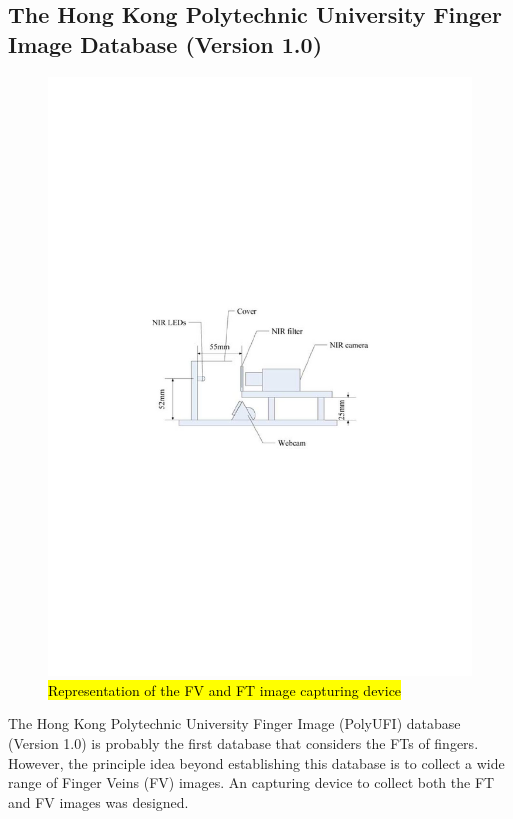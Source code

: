 \documentclass[review]{elsarticle}
\begin{document}
\subsection{The Hong Kong Polytechnic University Finger Image Database (Version 1.0)}
		\begin{figure}[!b]
			\centering
			\includegraphics[page=1,scale=1,trim=5cm 11.2cm 5cm 11cm,clip]{fv_ft_device.pdf}
			\caption{\hl{Representation of the FV and FT image capturing device} \cite{Kumar2012Human}}
			\label{fig:fv_ft_device}
		\end{figure}
	The Hong Kong Polytechnic University Finger Image (PolyUFI) database (Version 1.0) is probably the first database that considers the FTs of fingers. However, the principle idea beyond establishing this database is to collect a wide range of Finger Veins (FV) images. An capturing device to collect both the FT and FV images was designed. 
\end{document}
